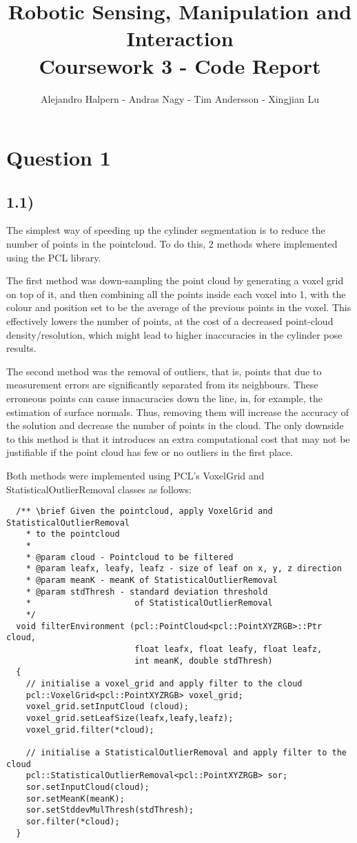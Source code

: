 \documentclass{homework}
\title{Robotic Sensing, Manipulation and Interaction \\ Coursework 3 - Code Report}
\author{Alejandro Halpern \hfill - \hfill Andras Nagy \hfill - \hfill Tim Andersson \hfill - \hfill Xingjian Lu}
\begin{document}
\maketitle
\section*{Question 1}

\subsection*{1.1)}
The simplest way of speeding up the cylinder segmentation is to reduce the number of points in the pointcloud. To do this, 2 methods where implemented using the PCL library.

The first method was down-sampling the point cloud by generating a voxel grid on top of it, and then combining all the points inside each voxel into 1, with the colour and position set to be the average of the previous points in the voxel. This effectively lowers the number of points, at the cost of a decreased point-cloud density/resolution, which might lead to higher inaccuracies in the cylinder pose results.

The second method was the removal of outliers, that is, points that due to measurement errors are significantly separated from its neighbours. These erroneous points can cause innacuracies down the line, in, for example, the estimation of surface normals. Thus, removing them will increase the accuracy of the solution and decrease the number of points in the cloud. The only downside to this method is that it introduces an extra computational cost that may not be justifiable if the point cloud has few or no outliers in the first place.

Both methods were implemented using PCL's VoxelGrid and StatisticalOutlierRemoval classes as follows:

\begin{verbatim}
  /** \brief Given the pointcloud, apply VoxelGrid and StatisticalOutlierRemoval
    * to the pointcloud
    *
    * @param cloud - Pointcloud to be filtered
    * @param leafx, leafy, leafz - size of leaf on x, y, z direction
    * @param meanK - meanK of StatisticalOutlierRemoval
    * @param stdThresh - standard deviation threshold
    *                     of StatisticalOutlierRemoval
    */
  void filterEnvironment (pcl::PointCloud<pcl::PointXYZRGB>::Ptr cloud,
                          float leafx, float leafy, float leafz,
                          int meanK, double stdThresh)
  {
    // initialise a voxel_grid and apply filter to the cloud
    pcl::VoxelGrid<pcl::PointXYZRGB> voxel_grid;
    voxel_grid.setInputCloud (cloud);
    voxel_grid.setLeafSize(leafx,leafy,leafz);
    voxel_grid.filter(*cloud);

    // initialise a StatisticalOutlierRemoval and apply filter to the cloud
    pcl::StatisticalOutlierRemoval<pcl::PointXYZRGB> sor;
    sor.setInputCloud(cloud);
    sor.setMeanK(meanK);
    sor.setStddevMulThresh(stdThresh);
    sor.filter(*cloud);
  }
\end{verbatim}
\end{document}
